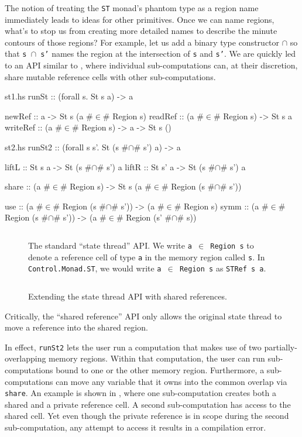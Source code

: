 \documentclass[format=sigplan, review=false, screen=true]{acmart}
\begin{document}
The notion of treating the \texttt{ST} monad's phantom type as a region name immediately leads to ideas for
other primitives. Once we can name regions, what's to stop us from creating more detailed names to describe
the minute contours of those regions? For example, let us add a binary type constructor $\cap$ so that \texttt{s $\cap$ s'}
names the region at the intersection of \texttt{s} and \texttt{s'}. We are quickly led to an API similar to ,
where individual sub-computations can, at their discretion, share mutable reference cells with other sub-computations.

\begin{filecontents*}{st1.hs}
runSt    :: (forall s. St s a) -> a

newRef   :: a -> St s (a #$\in$# Region s)
readRef  :: (a #$\in$# Region s) -> St s a
writeRef :: (a #$\in$# Region s) -> a -> St s ()
\end{filecontents*}

\begin{filecontents*}{st2.hs}
runSt2 :: (forall s s'. St (s #$\cap$# s') a) -> a

liftL :: St s a -> St (s #$\cap$# s') a
liftR :: St s' a -> St (s #$\cap$# s') a

share :: (a #$\in$# Region s) -> St s (a #$\in$# Region (s #$\cap$# s'))

use  :: (a #$\in$# Region (s #$\cap$# s')) -> (a #$\in$# Region s)
symm :: (a #$\in$# Region (s #$\cap$# s')) -> (a #$\in$# Region (s' #$\cap$# s))
\end{filecontents*}

\begin{figure}
  \inputminted{haskell}{st1.hs}
  \caption{The standard ``state thread'' API. We write \texttt{a $\in$ Region s} to
    denote a reference cell of type \texttt{a} in the memory region called \texttt{s}.
    In \texttt{Control.Monad.ST}, we would write \texttt{a $\in$ Region s} as
    \texttt{STRef s a}.\label{st-api}}
\end{figure}

\begin{figure}
  \inputminted{haskell}{st2.hs}
  \caption{Extending the state thread API with shared references.\label{st-sharing-api}}
\end{figure}
Critically, the ``shared reference'' API only allows the
original state thread to move a reference into the shared region.

In effect, \texttt{runSt2} lets the user run a computation that makes use of
two partially-overlapping memory regions. Within that computation, the user
can run sub-computations bound to one or the other memory region. Furthermore,
a sub-computations can move any variable that it owns into the common overlap
via \texttt{share}. An example is shown in , where one sub-computation
creates both a shared and a private reference cell. A second sub-computation has
access to the shared cell. Yet even though the private reference is in scope during
the second sub-computation, any attempt to access it results in a compilation error.
\end{document}
